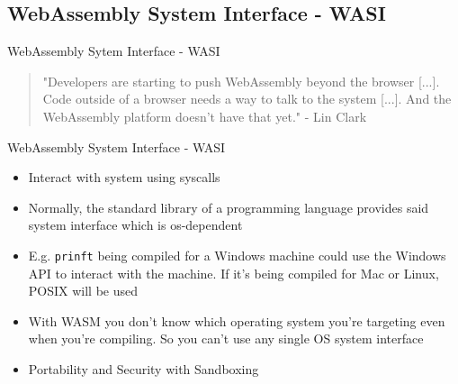 \documentclass{beamer}
\begin{document}
\subsection{WebAssembly System Interface - WASI}

\begin{frame}{WebAssembly Sytem Interface - WASI}
    \begin{quotation}
        "Developers are starting to push WebAssembly beyond the browser [...]. Code outside of a browser needs a way to talk to the system [...]. And the WebAssembly platform doesn’t have that yet." - Lin Clark
    \end{quotation}
\end{frame}

\begin{frame}{WebAssembly System Interface - WASI}
\begin{itemize} 
    \item Interact with system using syscalls
    \item Normally, the standard library of a programming language provides said system interface which is os-dependent
    \item E.g. \lstinline{prinft} being compiled for a Windows machine could use the Windows API to interact with the machine. If it's being compiled for Mac or Linux, POSIX will be used
    \item With WASM you don't know which operating system you're targeting even when you're compiling. So you can't use any single OS system interface 
    \item Portability and Security with Sandboxing
\end{itemize}
\end{frame}
\end{document}
